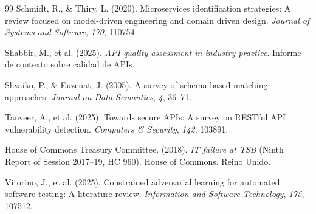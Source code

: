 \begin{thebibliography}{99}
Schmidt, R., \& Thiry, L. (2020).
Microservices identification strategies: A review focused on model-driven engineering and domain driven design.
\textit{Journal of Systems and Software}, \textit{170}, 110754.

Shabbir, M., et al. (2025).
\textit{API quality assessment in industry practice}.
Informe de contexto sobre calidad de APIs.

Shvaiko, P., \& Euzenat, J. (2005).
A survey of schema-based matching approaches.
\textit{Journal on Data Semantics}, \textit{4}, 36--71.

Tanveer, A., et al. (2025).
Towards secure APIs: A survey on RESTful API vulnerability detection.
\textit{Computers \& Security}, \textit{142}, 103891.

House of Commons Treasury Committee. (2018).
\textit{IT failure at TSB} (Ninth Report of Session 2017--19, HC 960).
House of Commons. Reino Unido.

Vitorino, J., et al. (2025).
Constrained adversarial learning for automated software testing: A literature review.
\textit{Information and Software Technology}, \textit{175}, 107512.

\end{thebibliography}
